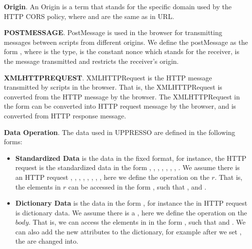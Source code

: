 \vspace{1mm}\noindent\textbf{Origin}.
An Origin is a term  that stands for the specific domain used by the HTTP CORS policy, where  and  are the same as in URL.

\vspace{1mm}\noindent\textbf{POSTMESSAGE}.
PostMessage is used in the browser for transmitting messages between scripts from different origins. We define the postMessage as the form , where  is the type,  is the constant nonce which stands for the receiver,  is the message transmitted and  restricts the receiver's origin.

\vspace{1mm}\noindent\textbf{XMLHTTPREQUEST}.
XMLHTTPRequest is the HTTP message transmitted  by scripts in the browser. That is, the XMLHTTPRequest is converted from the HTTP message by the browser. The XMLHTTPRequest in the form  can be converted into HTTP request message by the browser, and   is converted from HTTP response message.

\vspace{1mm}\noindent\textbf{Data Operation}.
The data used in UPPRESSO are defined in the following forms:
\begin{itemize}
\setlength\itemsep{-2pt}
\item \textbf{Standardized Data} is the data in the fixed format, for instance, the HTTP request is the standardized data in the form , , , , , , , .  We assume there is an HTTP request   ,  ,  ,  ,  ,  \myss{\myangle{}},  \myss{\myangle{}},  \myss{\myangle{}\rangle}, here we define the operation on the $r$. That is, the elements in $r$ can be accessed in the form , such that ,   and .
\item \textbf{Dictionary Data} is the data in the form , for instance the  in HTTP request is dictionary data. We assume there is a , here we define the operation on the $body$. That is, we can access the elements in  in the form , such that  and . We can also add the new attributes to the dictionary, for example after we set , the  are changed into.
\end{itemize}

